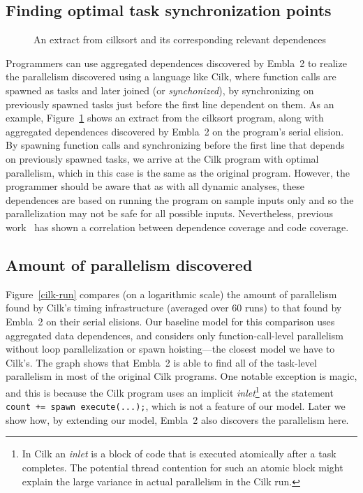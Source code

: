 \subsection{Finding optimal task synchronization points} \label{sresults:cilk-spawns}
\begin{figure}[t]
  \begin{center}
  \scriptsize
  
  \end{center}
  \caption{An extract from \textsf{cilksort} and its corresponding relevant dependences}
  \label{cilksort-depgraph}
\end{figure}

Programmers can use aggregated dependences discovered by Embla~2 to realize the parallelism discovered using a language like Cilk,
where function calls are spawned as tasks and later joined (or \emph{synchonized}),
by synchronizing on previously spawned tasks just before the first line dependent on them.
As an example, Figure~\ref{cilksort-depgraph} shows an extract from the \textsf{cilksort} program,
along with aggregated dependences discovered by Embla~2 on the program's serial elision.
By spawning function calls and synchronizing before the first line that depends on previously spawned tasks,
we arrive at the Cilk program with optimal parallelism, which in this case is the same as the original program.
However, the programmer should be aware that as with all dynamic analyses,
these dependences are based on running the program on sample inputs only and so the parallelization may not be safe for all possible inputs.
Nevertheless, previous work~\cite{embla:08} has shown a correlation between dependence coverage and code coverage.

\subsection{Amount of parallelism discovered} \label{sresults:cilk-limits}

Figure~\ref{cilk-run} compares (on a logarithmic scale) the amount of parallelism found by Cilk's timing infrastructure (averaged over 60 runs) to that found by Embla~2 on their serial elisions.
Our baseline model for this comparison uses aggregated data dependences, and considers only function-call-level parallelism without loop parallelization or spawn hoisting---the closest model we have to Cilk's.
The graph shows that Embla~2 is able to find all of the task-level parallelism in most of the original Cilk programs.
One notable exception is \textsf{magic},
and this is because the Cilk program uses an implicit \emph{inlet}\footnote{In Cilk an \emph{inlet} is a block of code that is executed atomically after a task completes. The potential thread contention for such an atomic block might explain the large variance in actual parallelism in the Cilk run.} at the statement \texttt{count += spawn execute(...);},
which is not a feature of our model.
Later we show how, by extending our model, Embla~2 also discovers the parallelism here.

